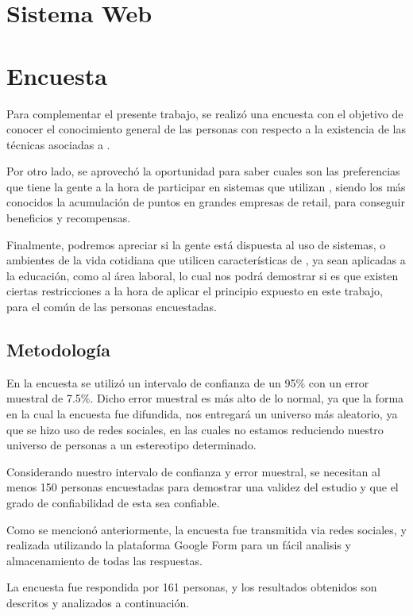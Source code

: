 \section{Sistema Web}


\section{Encuesta}

Para complementar el presente trabajo, se realizó una encuesta con el objetivo de
conocer el conocimiento general de las personas con respecto a la existencia
de las técnicas asociadas a {\GAM}.

Por otro lado, se aprovechó la oportunidad para saber cuales son las preferencias
que tiene la gente a la hora de participar en sistemas que utilizan {\GAM},
siendo los más conocidos la acumulación de puntos en grandes empresas de retail,
para conseguir beneficios y recompensas.

Finalmente, podremos apreciar si la gente está dispuesta al uso de sistemas,
o ambientes de la vida cotidiana que utilicen características de {\GAM},
ya sean aplicadas a la educación, como al área laboral, lo cual nos podrá
demostrar si es que existen ciertas restricciones a la hora de aplicar
el principio expuesto en este trabajo, para el común de las personas
encuestadas.

\subsection{Metodología}

En la encuesta se utilizó un intervalo de confianza de un 95\% con un error
muestral de 7.5\%.
Dicho error muestral es más alto de lo normal, ya que la forma en la cual la encuesta
fue difundida, nos entregará un universo más aleatorio, ya que se hizo uso de redes
sociales, en las cuales no estamos reduciendo nuestro universo de personas
a un estereotipo determinado.

Considerando nuestro intervalo de confianza y error muestral,
se necesitan al menos 150 personas encuestadas para demostrar
una validez del estudio y que el grado de confiabilidad de esta
sea confiable.

Como se mencionó anteriormente, la encuesta fue transmitida via redes sociales,
y realizada utilizando la plataforma Google Form para un fácil analisis y
almacenamiento de todas las respuestas.

La encuesta fue respondida por 161 personas,
y los resultados obtenidos son descritos y analizados a continuación.

